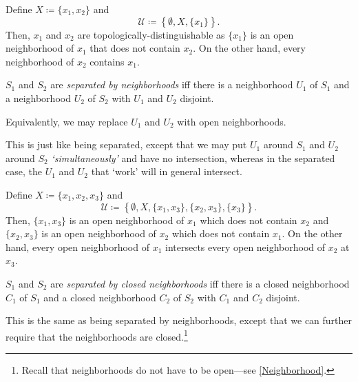 \begin{exm}\label{exm4.5.3}
Define $X\coloneqq \{ x_1,x_2\}$ and
\begin{equation}
\mathcal{U}\coloneqq \left\{ \emptyset ,X,\{ x_1\} \right\} .
\end{equation}
Then, $x_1$ and $x_2$ are topologically-distinguishable as $\{ x_1\}$ is an open neighborhood of $x_1$ that does not contain $x_2$.  On the other hand, every neighborhood of $x_2$ contains $x_1$.
\end{exm}
\begin{dfn}\label{SeparatedByNeighborhoods}
$S_1$ and $S_2$ are \emph{separated by neighborhoods} iff there is a neighborhood $U_1$ of $S_1$ and a neighborhood $U_2$ of $S_2$ with $U_1$ and $U_2$ disjoint.
\begin{rmk}
Equivalently, we may replace $U_1$ and $U_2$ with open neighborhoods.
\end{rmk}
\begin{rmk}
This is just like being separated, except that we may put $U_1$ around $S_1$ and $U_2$ around $S_2$ \emph{`simultaneously'} and have no intersection, whereas in the separated case, the $U_1$ and $U_2$ that `work' will in general intersect.
\end{rmk}
\end{dfn}
\begin{exm}\label{exm4.5.8}
Define $X\coloneqq \{ x_1,x_2,x_3\}$ and
\begin{equation}
\mathcal{U}\coloneqq \left\{ \emptyset ,X,\{ x_1,x_3\} ,\{ x_2,x_3\} ,\{ x_3\} \right\} .
\end{equation}
Then, $\{ x_1,x_3\}$ is an open neighborhood of $x_1$ which does not contain $x_2$ and $\{ x_2,x_3\}$ is an open neighborhood of $x_2$ which does not contain $x_1$.  On the other hand, every open neighborhood of $x_1$ intersects every open neighborhood of $x_2$ at $x_3$.
\end{exm}
\begin{dfn}\label{SeparatedByClosedNeighborhoods}
$S_1$ and $S_2$ are \emph{separated by closed neighborhoods} iff there is a closed neighborhood $C_1$ of $S_1$ and a closed neighborhood $C_2$ of $S_2$ with $C_1$ and $C_2$ disjoint.
\begin{rmk}
This is the same as being separated by neighborhoods, except that we can further require that the neighborhoods are closed.\footnote{Recall that neighborhoods do not have to be open---see \cref{Neighborhood}.}
\end{rmk}
\end{dfn}
